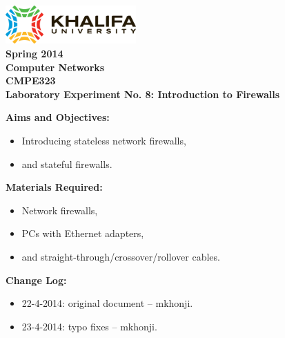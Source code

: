 \documentclass[pdftex,12pt,a4paper]{article}
\begin{document}
    \begin{titlepage}
        \begin{center}
            \includegraphics[width=5cm]{figures/kulogo}\\[1cm]
            {\Large \bfseries
                Spring 2014\\
                Computer Networks\\
                CMPE323\\[1cm]
            }
            {\large \bfseries
                \noindent Laboratory Experiment No. 8: Introduction to Firewalls\\[1cm]
            }
        \end{center}

        \noindent \textbf{Aims and Objectives:}
            \begin{itemize}[leftmargin=4cm]
                \item Introducing stateless network firewalls,
                \item and stateful firewalls.
            \end{itemize}
            \vspace{0.5cm}

        \noindent \textbf{Materials Required:}
            \begin{itemize}[leftmargin=4cm]
                \item Network firewalls,
                \item PCs with Ethernet adapters,
                \item and straight-through/crossover/rollover cables.
            \end{itemize}
            \vspace{0.5cm}

        \noindent \textbf{Change Log:}
            \begin{itemize}[leftmargin=4cm]
                \item 22-4-2014: original document -- mkhonji.
                \item 23-4-2014: typo fixes  -- mkhonji.
            \end{itemize}
    \end{titlepage}
    \newpage

\end{document}

